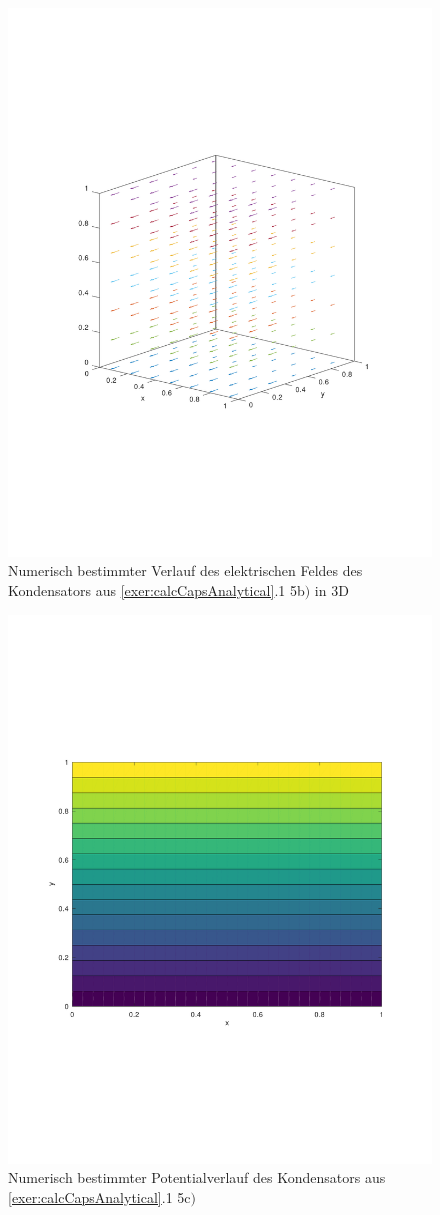 \documentclass[Protokollheft.tex]{subfiles}
\begin{document}
\begin{figure}[h!]
	\centering
	\includegraphics[trim = 20mm 70mm 20mm 70mm, clip,width=0.7\linewidth]{E_3D_B.pdf}
	\caption{Numerisch bestimmter Verlauf des elektrischen Feldes des Kondensators aus \ref{exer:calcCapsAnalytical}.1 5b$)$ in 3D}
\end{figure}

\begin{figure}[h!]
	\centering
	\includegraphics[trim = 20mm 70mm 20mm 70mm, clip,width=0.7\linewidth]{potential_C.pdf}
	\caption{Numerisch bestimmter Potentialverlauf des Kondensators aus \ref{exer:calcCapsAnalytical}.1 5c$)$}
\end{figure}
\end{document}
